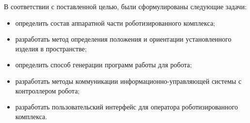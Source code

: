 В соответствии с поставленной целью, были сформулированы следующие задачи:

\begin{itemize}
    \item определить состав аппаратной части роботизированного комплекса;
    \item разработать метод определения положения и ориентации установленного изделия в пространстве;
    \item определить способ генерации программ работы для робота;
    \item разработать методы коммуникации информационно-управляющей системы с контроллером робота;
    \item разработать пользовательский интерфейс для оператора роботизированного комплекса.
\end{itemize}
